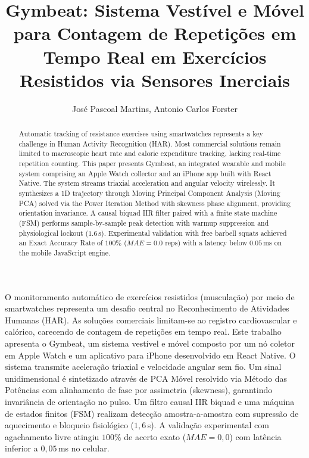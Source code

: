 \documentclass[12pt]{article}
\title{Gymbeat: Sistema Vestível e Móvel para Contagem de Repetições em Tempo Real em Exercícios Resistidos via Sensores Inerciais}
\author{José Pascoal Martins\inst{1}, Antonio Carlos Forster\inst{1}}
\begin{document}
 

\maketitle

\begin{abstract}
Automatic tracking of resistance exercises using smartwatches represents a key challenge in Human Activity Recognition (HAR). Most commercial solutions remain limited to macroscopic heart rate and caloric expenditure tracking, lacking real-time repetition counting. This paper presents Gymbeat, an integrated wearable and mobile system comprising an Apple Watch collector and an iPhone app built with React Native. The system streams triaxial acceleration and angular velocity wirelessly. It synthesizes a 1D trajectory through Moving Principal Component Analysis (Moving PCA) solved via the Power Iteration Method with skewness phase alignment, providing orientation invariance. A causal biquad IIR filter paired with a finite state machine (FSM) performs sample-by-sample peak detection with warmup suppression and physiological lockout ($1.6\,$s). Experimental validation with free barbell squats achieved an Exact Accuracy Rate of $100\%$ ($MAE = 0.0$ reps) with a latency below $0.05\,$ms on the mobile JavaScript engine.
\end{abstract}
     
\begin{resumo} 
O monitoramento automático de exercícios resistidos (musculação) por meio de smartwatches representa um desafio central no Reconhecimento de Atividades Humanas (HAR). As soluções comerciais limitam-se ao registro cardiovascular e calórico, carecendo de contagem de repetições em tempo real. Este trabalho apresenta o Gymbeat, um sistema vestível e móvel composto por um nó coletor em Apple Watch e um aplicativo para iPhone desenvolvido em React Native. O sistema transmite aceleração triaxial e velocidade angular sem fio. Um sinal unidimensional é sintetizado através de PCA Móvel resolvido via Método das Potências com alinhamento de fase por assimetria (skewness), garantindo invariância de orientação no pulso. Um filtro causal IIR biquad e uma máquina de estados finitos (FSM) realizam detecção amostra-a-amostra com supressão de aquecimento e bloqueio fisiológico ($1{,}6\,$s). A validação experimental com agachamento livre atingiu $100\%$ de acerto exato ($MAE = 0{,}0$) com latência inferior a $0{,}05\,$ms no celular.
\end{resumo}
\end{document}
